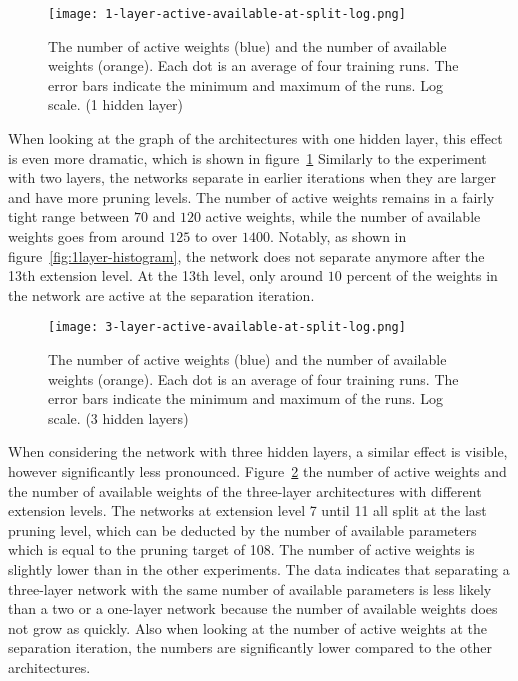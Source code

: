 \begin{figure}[ht] %
    \centering
    \texttt{[image: 1-layer-active-available-at-split-log.png]}
    \caption[Comparing active and available weights (1 hidden layer)]{
    The number of active weights (blue) and the number of available weights (orange).
    Each dot is an average of four training runs.
    The error bars indicate the minimum and maximum of the runs.
    Log scale.  (1 hidden layer)
}\label{fig:1layer-active}
\end{figure}
When looking at the graph of the architectures with one hidden layer, this effect is even more dramatic, which is shown in figure~\ref{fig:1layer-active}
Similarly to the experiment with two layers, the networks separate in earlier iterations when they are larger and have more pruning levels.
The number of active weights remains in a fairly tight range between $70$ and $120$ active weights, while the number of available weights goes from around $125$ to over $1400$.
Notably, as shown in figure~\ref{fig:1layer-histogram}, the network does not separate anymore after the 13th extension level.
At the 13th level, only around $10$ percent of the weights in the network are active at the separation iteration.

\begin{figure}[ht] %
    \centering
    \texttt{[image: 3-layer-active-available-at-split-log.png]}
    \caption[Comparing active and available weights (3 hidden layers)]{
    The number of active weights (blue) and the number of available weights (orange).
    Each dot is an average of four training runs.
    The error bars indicate the minimum and maximum of the runs.
    Log scale.  (3 hidden layers)
    }\label{fig:3layer-active}
\end{figure}
When considering the network with three hidden layers, a similar effect is visible, however significantly less pronounced.
Figure~\ref{fig:3layer-active} the number of active weights and the number of available weights of the three-layer architectures with different extension levels.
The networks at extension level 7 until 11 all split at the last pruning level, which can be deducted by the number of available parameters which is equal to the pruning target of 108.
The number of active weights is slightly lower than in the other experiments.
The data indicates that separating a three-layer network with the same number of available parameters is less likely than a two or a one-layer network because the number of available weights does not grow as quickly.
Also when looking at the number of active weights at the separation iteration, the numbers are significantly lower compared to the other architectures.

